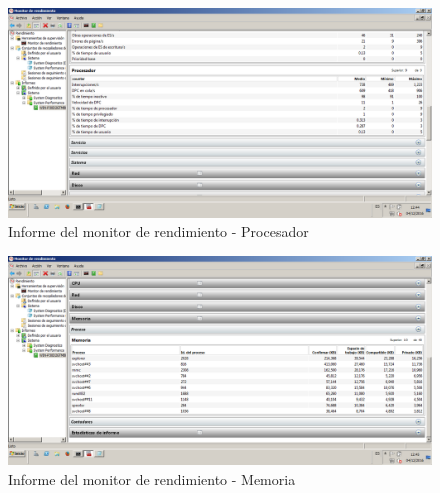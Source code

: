 \begin{figure}[H] %
\centering
\includegraphics[scale=0.4]{./imagenes/P3_4_3.png} 
\caption{Informe del monitor de rendimiento - Procesador} \label{fig:P3_4_3}
\end{figure}

\begin{figure}[H] %
\centering
\includegraphics[scale=0.4]{./imagenes/P3_4_4.png} 
\caption{Informe del monitor de rendimiento - Memoria} \label{fig:P3_4_4}
\end{figure}

